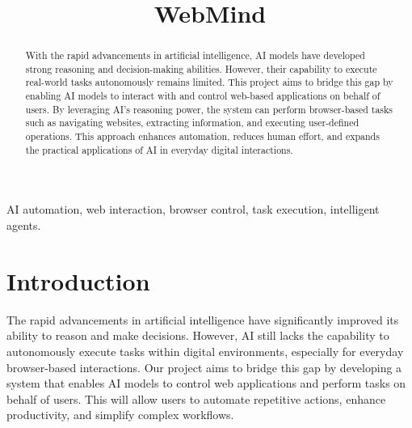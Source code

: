 \documentclass[conference]{IEEEtran}
\begin{document}
\title{WebMind\\
}

\author{

    \and
}

\maketitle

\begin{abstract}
    With the rapid advancements in artificial intelligence, AI models have developed strong reasoning and decision-making abilities. However, their capability to execute real-world tasks autonomously remains limited. This project aims to bridge this gap by enabling AI models to interact with and control web-based applications on behalf of users. By leveraging AI's reasoning power, the system can perform browser-based tasks such as navigating websites, extracting information, and executing user-defined operations. This approach enhances automation, reduces human effort, and expands the practical applications of AI in everyday digital interactions.
\end{abstract}

\begin{IEEEkeywords}
    AI automation, web interaction, browser control, task execution, intelligent agents.
\end{IEEEkeywords}

\section{Introduction}
The rapid advancements in artificial intelligence have significantly improved its ability to reason and make decisions. However, AI still lacks the capability to autonomously execute tasks within digital environments, especially for everyday browser-based interactions. Our project aims to bridge this gap by developing a system that enables AI models to control web applications and perform tasks on behalf of users. This will allow users to automate repetitive actions, enhance productivity, and simplify complex workflows.
\end{document}
